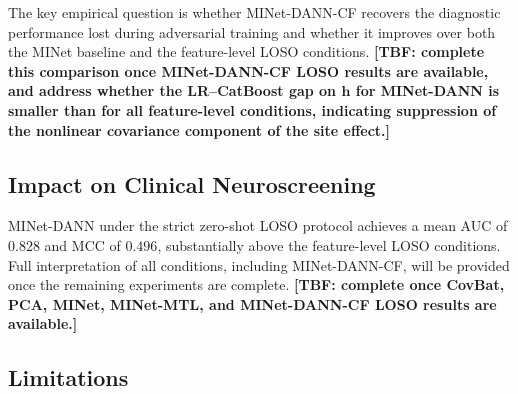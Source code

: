 \documentclass[preprint,12pt]{elsarticle}
\begin{document}
The key empirical question is whether MINet-DANN-CF recovers the
diagnostic performance lost during adversarial training and whether
it improves over both the MINet baseline and the feature-level LOSO
conditions.
\textbf{[TBF: complete this comparison once MINet-DANN-CF LOSO
results are available, and address whether the LR--CatBoost gap on
$\mathbf{h}$ for MINet-DANN is smaller than for all feature-level
conditions, indicating suppression of the nonlinear covariance
component of the site effect.]}
\subsection{Impact on Clinical Neuroscreening}
\label{subsec:disc_clinical}

MINet-DANN under the strict zero-shot LOSO protocol achieves a mean
AUC of $0.828$ and MCC of $0.496$, substantially above the
feature-level LOSO conditions.
Full interpretation of all conditions, including MINet-DANN-CF, will
be provided once the remaining experiments are complete.
\textbf{[TBF: complete once CovBat, PCA, MINet, MINet-MTL, and
MINet-DANN-CF LOSO results are available.]}

\subsection{Limitations}
\label{subsec:limitations}
\end{document}
